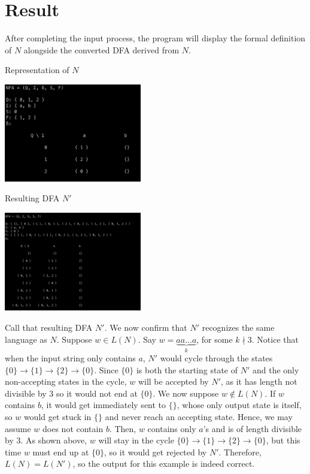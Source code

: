 \documentclass{article}
\begin{document}
\newpage

\section*{Result}

After completing the input process, the program will display the formal definition of $N$ alongside the converted DFA derived from $N$.

\begin{center}
  \begin{multicols}{2}
    Representation of $N$

    \includegraphics[width=0.45\textwidth]{NFA}

    \columnbreak 

    Resulting DFA $N'$

    \includegraphics[width=0.45\textwidth]{DFA}
  \end{multicols}
\end{center}

Call that resulting DFA $N'$. We now confirm that $N'$ recognizes the same language as $N$. Suppose $w \in L(N)$. Say $w = \underbrace{aa \dots a}_{k}$, for some $k \nmid 3$. Notice that when the input string only contains $a$, $N'$ would cycle through the states $\{0\} \rightarrow \{1\} \rightarrow \{2\} \rightarrow \{0\}$. Since $\{0\}$ is both the starting state of $N'$ and the only non-accepting states in the cycle, $w$ will be accepted by $N'$, as it has length not divisible by 3 so it would not end at $\{0\}$. We now suppose $w \notin L(N)$. If $w$ contains $b$, it would get immediately sent to $\{\}$, whose only output state is itself, so $w$ would get stuck in $\{\}$ and never reach an accepting state. Hence, we may assume $w$ does not contain $b$. Then, $w$ contains only $a$'s and is of length divisible by $3$. As shown above, $w$ will stay in the cycle $\{0\} \rightarrow \{1\} \rightarrow \{2\} \rightarrow \{0\}$, but this time $w$ must end up at $\{0\}$, so it would get
rejected by $N'$. Therefore, $L(N) = L(N')$, so the output for this example is indeed correct.
\end{document}
